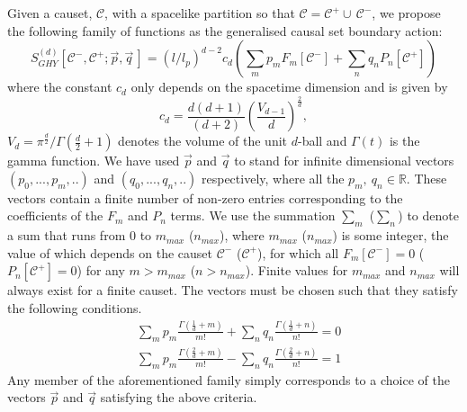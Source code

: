 \documentclass[12pt]{article}
\newcommand{\be}{\begin{equation}}
\newcommand{\ee}{\end{equation}}
\newcommand{\F}[1]{F_{#1}}
\renewcommand{\P}[1]{P_{#1}}
\begin{document}
Given a causet, $\mathcal{C}$, with a spacelike partition so that $\mathcal C = \mathcal C^+ \cup\, \mathcal C^-$, we propose the following family of functions as the generalised causal set boundary action:
\be\label{general_boundary_sum}
S^{ (d)}_{GHY}\left[\mathcal{C}^-,\mathcal{C}^+;\vec{p}, \vec{q}\,\right]= \left (l/l_p\right)^{d-2} c_{d}
\left ( \sum_m p_m \F{m}\left[\mathcal{C}^- \right]
+  \sum_n q_n \P{n}\left[\mathcal{C}^+ \right]\right)
\ee
where the constant $c_{d}$ only depends on the spacetime dimension and is given by
\be\label{Cn}
c_{d}=\frac{d (d+1)}{ (d+2)}\left(\frac{V_{d-1}}{d}\right)^{\frac{2}{d}},
\ee
$V_d=\pi^{\frac{d}{2}}/\Gamma\left (\frac{d}{2}+1\right)$ denotes the volume of the unit $d$-ball and $\Gamma (t)$ is the gamma function. We have used $\vec{p}$ and $\vec{q}$ to stand for infinite dimensional vectors $ (p_0,...,p_m,..)$ and $ (q_0,...,q_n,..)$ respectively, where all the $p_m,\: q_n \in \mathbb{R}$. These vectors contain a finite number of non-zero entries corresponding to the coefficients of the $\F{m}$ and $\P{n}$ terms. We use the summation $\sum_m$ ($\sum_n$) to denote a sum that runs from $0$ to $m_{max}$ ($n_{max}$), where $m_{max}$ ($n_{max}$) is some integer, the value of which depends on the causet $\mathcal{C}^-$ ($\mathcal{C}^+$), for which all $\F{m}\left[\mathcal{C}^- \right]=0$ ($\P{n}\left[\mathcal{C}^+ \right]=0$) for any $m>m_{max}$ ($n>n_{max}$). Finite values for $m_{max}$ and $n_{max}$ will always exist for a finite causet. The vectors must be chosen such that they satisfy the following conditions.
\begin{align}\label{coefficient_relation1}
& \sum_m p_m \frac{\Gamma\left (\frac{1}{d}+m \right)}{m!}  + \sum_n q_n\frac{\Gamma\left (\frac{1}{d}+n \right)}{n!}=0
\\
& \label{coefficient_relation2}\sum_m p_m \frac{\Gamma\left (\frac{2}{d}+m \right)}{m!}  - \sum_n q_n\frac{\Gamma\left (\frac{2}{d}+n \right)}{n!}=1
\end{align}
Any member of the aforementioned family simply corresponds to a choice of the vectors $\vec{p}$ and $\vec{q}$ satisfying the above criteria.
\end{document}
